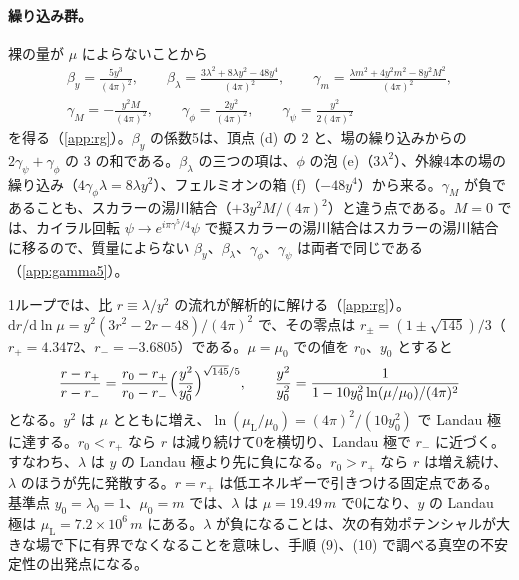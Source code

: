 \documentclass[a4paper,10pt]{ltjsarticle}
\newcommand{\dd}{\mathrm{d}}
\begin{document}
\paragraph{繰り込み群。}裸の量が $\mu$ によらないことから
\begin{equation}
\begin{gathered}
\beta_y=\frac{5y^3}{(4\pi)^2},\qquad
\beta_\lambda=\frac{3\lambda^2+8\lambda y^2-48y^4}{(4\pi)^2},\qquad
\gamma_m=\frac{\lambda m^2+4y^2m^2-8y^2M^2}{(4\pi)^2},\\
\gamma_M=-\frac{y^2M}{(4\pi)^2},\qquad
\gamma_\phi=\frac{2y^2}{(4\pi)^2},\qquad
\gamma_\psi=\frac{y^2}{2(4\pi)^2}
\end{gathered}
\label{eq:rge}
\end{equation}
を得る（\ref{app:rg}）。$\beta_y$ の係数5は、頂点 (d) の $2$ と、場の繰り込みからの $2\gamma_\psi+\gamma_\phi$ の $3$ の和である。$\beta_\lambda$ の三つの項は、$\phi$ の泡 (e)（$3\lambda^2$）、外線4本の場の繰り込み（$4\gamma_\phi\lambda=8\lambda y^2$）、フェルミオンの箱 (f)（$-48y^4$）から来る。$\gamma_M$ が負であることも、スカラーの湯川結合（$+3y^2M/(4\pi)^2$）と違う点である。$M=0$ では、カイラル回転 $\psi\to e^{i\pi\gamma^5/4}\psi$ で擬スカラーの湯川結合はスカラーの湯川結合に移るので、質量によらない $\beta_y$、$\beta_\lambda$、$\gamma_\phi$、$\gamma_\psi$ は両者で同じである（\ref{app:gamma5}）。

1ループでは、比 $r\equiv\lambda/y^2$ の流れが解析的に解ける（\ref{app:rg}）。$\dd r/\dd\ln\mu=y^2(3r^2-2r-48)/(4\pi)^2$ で、その零点は $r_\pm=(1\pm\sqrt{145})/3$（$r_+=4.3472$、$r_-=-3.6805$）である。$\mu=\mu_0$ での値を $r_0$、$y_0$ とすると
\begin{equation}
\frac{r-r_+}{r-r_-}=\frac{r_0-r_+}{r_0-r_-}\Bigl(\frac{y^2}{y_0^2}\Bigr)^{\sqrt{145}/5},\qquad
\frac{y^2}{y_0^2}=\frac{1}{1-10y_0^2\ln(\mu/\mu_0)/(4\pi)^2}
\label{eq:rflow}
\end{equation}
となる。$y^2$ は $\mu$ とともに増え、$\ln(\mu_{\mathrm L}/\mu_0)=(4\pi)^2/(10y_0^2)$ で Landau 極に達する。$r_0<r_+$ なら $r$ は減り続けて0を横切り、Landau 極で $r_-$ に近づく。すなわち、$\lambda$ は $y$ の Landau 極より先に負になる。$r_0>r_+$ なら $r$ は増え続け、$\lambda$ のほうが先に発散する。$r=r_+$ は低エネルギーで引きつける固定点である。基準点 $y_0=\lambda_0=1$、$\mu_0=m$ では、$\lambda$ は $\mu=19.49\,m$ で0になり、$y$ の Landau 極は $\mu_{\mathrm L}=7.2\times10^6\,m$ にある。$\lambda$ が負になることは、次の有効ポテンシャルが大きな場で下に有界でなくなることを意味し、手順 (9)、(10) で調べる真空の不安定性の出発点になる。
\end{document}

